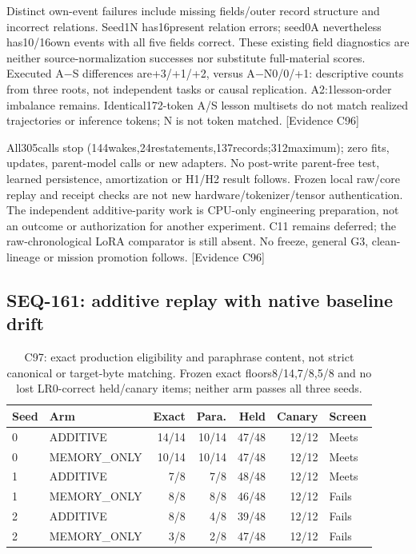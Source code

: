 \documentclass[11pt]{article}
\newcommand{\ev}[1]{\textsf{[Evidence #1]}}
\begin{document}
Distinct own-event failures include missing fields/outer record structure and
incorrect relations. Seed1N has16present relation errors; seed0A nevertheless
has10/16own events with all five fields correct. These existing field diagnostics
are neither source-normalization successes nor substitute full-material scores.
Executed A$-$S differences are+3/+1/+2, versus A$-$N0/0/+1: descriptive counts
from three roots, not independent tasks or causal replication. A2:1lesson-order
imbalance remains. Identical172-token A/S lesson multisets do not match realized
trajectories or inference tokens; N is not token matched. \ev{C96}

All305calls stop (144wakes,24restatements,137records;312maximum); zero fits,
updates, parent-model calls or new adapters. No post-write parent-free test, learned
persistence, amortization or H1/H2 result follows. Frozen local raw/core replay
and receipt checks are not new hardware/tokenizer/tensor authentication.
The independent additive-parity work is CPU-only engineering preparation, not
an outcome or authorization for another experiment. C11 remains deferred;
the raw-chronological LoRA comparator is still absent. No freeze, general G3,
clean-lineage or mission promotion follows. \ev{C96}

\subsection{SEQ-161: additive replay with native baseline drift}
\label{sec:seq161-additive}
\begin{table}[t]
\centering
\small
\begin{tabular}{llrrrrl}
\toprule
Seed & Arm & Exact & Para. & Held & Canary & Screen \\
\midrule
0 & ADDITIVE & 14/14 & 10/14 & 47/48 & 12/12 & Meets \\
0 & MEMORY\_ONLY & 10/14 & 10/14 & 47/48 & 12/12 & Meets \\
1 & ADDITIVE & 7/8 & 7/8 & 48/48 & 12/12 & Meets \\
1 & MEMORY\_ONLY & 8/8 & 8/8 & 46/48 & 12/12 & Fails \\
2 & ADDITIVE & 8/8 & 4/8 & 39/48 & 12/12 & Fails \\
2 & MEMORY\_ONLY & 3/8 & 2/8 & 47/48 & 12/12 & Fails \\
\bottomrule
\end{tabular}
\caption{C97: exact production eligibility and paraphrase content, not strict
canonical or target-byte matching. Frozen exact floors8/14,7/8,5/8 and no lost
LR0-correct held/canary items; neither arm passes all three seeds.}
\label{tab:seq161-additive}
\end{table}
\end{document}
